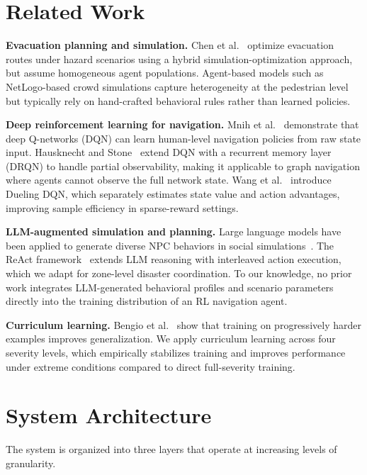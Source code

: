 \documentclass[11pt]{article}
\begin{document}
\section{Related Work}

\textbf{Evacuation planning and simulation.} Chen et al.~\cite{chen2018} optimize evacuation routes under hazard scenarios using a hybrid simulation-optimization approach, but assume homogeneous agent populations. Agent-based models such as NetLogo-based crowd simulations capture heterogeneity at the pedestrian level but typically rely on hand-crafted behavioral rules rather than learned policies.

\textbf{Deep reinforcement learning for navigation.} Mnih et al.~\cite{mnih2015} demonstrate that deep Q-networks (DQN) can learn human-level navigation policies from raw state input. Hausknecht and Stone~\cite{hausknecht2015} extend DQN with a recurrent memory layer (DRQN) to handle partial observability, making it applicable to graph navigation where agents cannot observe the full network state. Wang et al.~\cite{wang2016} introduce Dueling DQN, which separately estimates state value and action advantages, improving sample efficiency in sparse-reward settings.

\textbf{LLM-augmented simulation and planning.} Large language models have been applied to generate diverse NPC behaviors in social simulations~\cite{meta2024llama3}. The ReAct framework~\cite{yao2023react} extends LLM reasoning with interleaved action execution, which we adapt for zone-level disaster coordination. To our knowledge, no prior work integrates LLM-generated behavioral profiles and scenario parameters directly into the training distribution of an RL navigation agent.

\textbf{Curriculum learning.} Bengio et al.~\cite{bengio2009curriculum} show that training on progressively harder examples improves generalization. We apply curriculum learning across four severity levels, which empirically stabilizes training and improves performance under extreme conditions compared to direct full-severity training.

\section{System Architecture}

The system is organized into three layers that operate at increasing levels of granularity.
\end{document}
